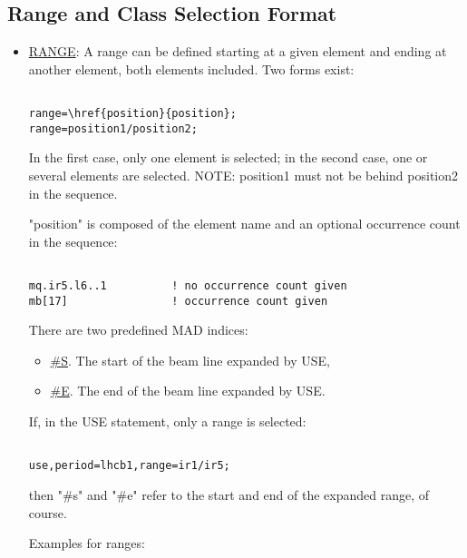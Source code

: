 




\subsection{Range and Class Selection Format}


\begin{itemize}
	\item \href{range}{RANGE}: A range can be defined starting at  a given element and ending at another element, both elements included. Two forms exist: 
\begin{verbatim}

range=\href{position}{position};
range=position1/position2;
\end{verbatim} In the first case, only one element is selected; in the second case, one or several elements are selected. NOTE: position1 must not be behind position2 in the sequence. 

 "position" is composed of the element name and an optional occurrence count in the sequence: 
\begin{verbatim}

mq.ir5.l6..1          ! no occurrence count given
mb[17]                ! occurrence count given
\end{verbatim} There are two predefined MAD indices: 
\begin{itemize}
	\item \href{s}{\#S}. The start of the beam line expanded by USE, 
	\item \href{e}{\#E}. The end of the beam line expanded by USE. 
\end{itemize} If, in the USE statement, only a range is selected: 
\begin{verbatim}

use,period=lhcb1,range=ir1/ir5;
\end{verbatim} then "\#s" and "\#e" refer to the start and end of the expanded range, of course. 

 Examples for ranges: 
\begin{verbatim}


\end{verbatim}
\end{itemize}
